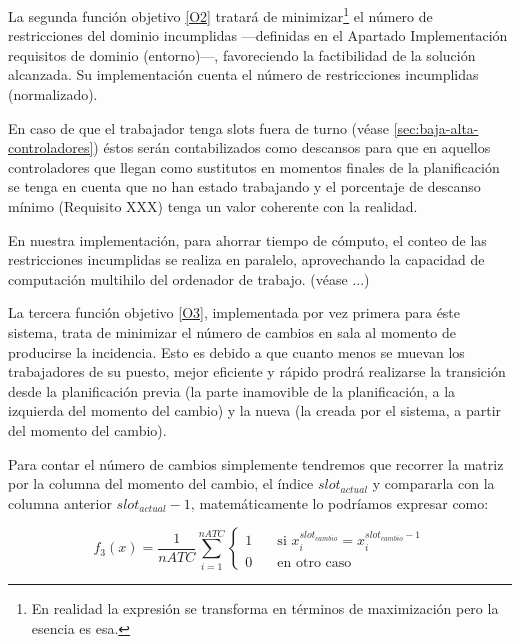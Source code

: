 La segunda función objetivo \ref{O2} tratará de minimizar\footnote{En realidad la expresión se transforma en términos de maximización pero la esencia es esa.} el número de restricciones del dominio incumplidas ---definidas en el Apartado Implementación requisitos de dominio (entorno)---, %
favoreciendo la factibilidad de la solución alcanzada. Su implementación cuenta el número de restricciones incumplidas (normalizado). 

En caso de que el trabajador tenga slots fuera de turno (véase \autoref{sec:baja-alta-controladores}) éstos serán contabilizados como descansos para que en aquellos controladores que llegan como sustitutos en momentos finales de la planificación se tenga en cuenta que no han estado trabajando y el porcentaje de descanso mínimo (Requisito XXX) %
tenga un valor coherente con la realidad.

En nuestra implementación, para ahorrar tiempo de cómputo, el conteo de las restricciones incumplidas se realiza en paralelo, aprovechando la capacidad de computación multihilo del ordenador de trabajo. (véase ...) %

La tercera función objetivo \ref{O3}, implementada por vez primera para éste sistema, trata de minimizar el número de cambios en sala al momento de producirse la incidencia. Esto es debido a que cuanto menos se muevan los trabajadores de su puesto, mejor eficiente y rápido prodrá realizarse la transición desde la planificación previa (la parte inamovible de la planificación, a la izquierda del momento del cambio) y la nueva (la creada por el sistema, a partir del momento del cambio).

Para contar el número de cambios simplemente tendremos que recorrer la matriz por la columna del momento del cambio, el índice $slot_{actual}$ y compararla con la columna anterior $slot_{actual}-1$, matemáticamente lo podríamos expresar como:

\[
	f_3(x) = \frac{1}{nATC} \sum_{i=1}^{nATC} 
	\begin{cases}
		1 & \quad \textrm{si } x_i^{slot_{cambio}} = x_i^{slot_{cambio}-1} \\
		0 & \quad \textrm{en otro caso }
	\end{cases}
\]



